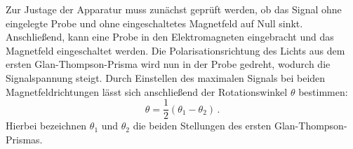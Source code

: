 Zur Justage der Apparatur muss zunächst geprüft werden, ob das Signal ohne
eingelegte Probe und ohne eingeschaltetes Magnetfeld auf Null sinkt.
Anschließend, kann eine Probe in den Elektromagneten eingebracht und
das Magnetfeld eingeschaltet werden.
Die Polarisationsrichtung des Lichts aus dem ersten Glan-Thompson-Prisma wird
nun in der Probe gedreht, wodurch die Signalspannung steigt.
Durch Einstellen des maximalen Signals bei beiden Magnetfeldrichtungen
lässt sich anschließend der Rotationswinkel $\theta$ bestimmen:
\begin{equation}
    \label{eqn:theta_messung}
    \theta = \frac{1}{2}\left(\theta_1-\theta_2\right)\,.
\end{equation}
Hierbei bezeichnen $\theta_1$ und $\theta_2$ die beiden Stellungen des ersten
Glan-Thompson-Prismas.

